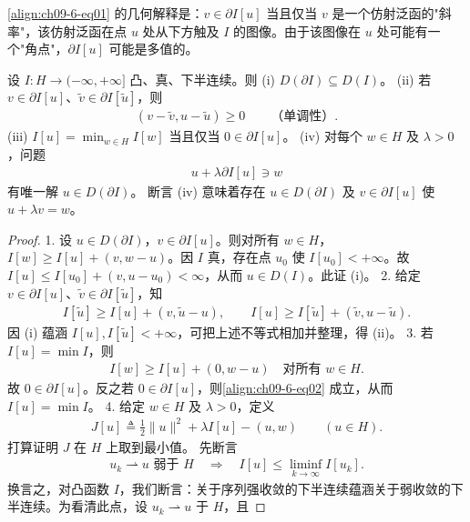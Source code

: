 \documentclass[../../main.tex]{subfiles}
\begin{document}
\eqref{align:ch09-6-eq01} 的几何解释是：$v\in\partial I[u]$ 当且仅当 $v$ 是一个仿射泛函的"斜率"，该仿射泛函在点 $u$ 处从下方触及 $I$ 的图像。由于该图像在 $u$ 处可能有一个"角点"，$\partial I[u]$ 可能是多值的。

\begin{theorem}[次微分的性质]\label{theorem:ch09-6-1-次微分性质}
设 $I:H\to(-\infty,+\infty]$ 凸、真、下半连续。则
(i) $D(\partial I)\subseteq D(I)$。
(ii) 若 $v\in\partial I[u]$、$\widetilde{v}\in\partial I[\widetilde{u}]$，则
\begin{align*}
(v-\widetilde{v},u-\widetilde{u})\geqslant 0\qquad\text{（单调性）}.
\end{align*}
(iii) $I[u]=\min_{w\in H}I[w]$ 当且仅当 $0\in\partial I[u]$。
(iv) 对每个 $w\in H$ 及 $\lambda>0$，问题
\begin{align*}
u+\lambda\partial I[u]\ni w
\end{align*}
有唯一解 $u\in D(\partial I)$。
断言 (iv) 意味着存在 $u\in D(\partial I)$ 及 $v\in\partial I[u]$ 使 $u+\lambda v=w$。
\begin{proof}
1. 设 $u\in D(\partial I)$，$v\in\partial I[u]$。则对所有 $w\in H$，$I[w]\geqslant I[u]+(v,w-u)$。因 $I$ 真，存在点 $u_0$ 使 $I[u_0]<+\infty$。故 $I[u]\leqslant I[u_0]+(v,u-u_0)<\infty$，从而 $u\in D(I)$。此证 (i)。
2. 给定 $v\in\partial I[u]$、$\widetilde{v}\in\partial I[\widetilde{u}]$，知
\begin{align*}
I[\widetilde{u}]\geqslant I[u]+(v,\widetilde{u}-u),\qquad I[u]\geqslant I[\widetilde{u}]+(\widetilde{v},u-\widetilde{u}).
\end{align*}
因 (i) 蕴涵 $I[u],I[\widetilde{u}]<+\infty$，可把上述不等式相加并整理，得 (ii)。
3. 若 $I[u]=\min I$，则
\begin{align}
I[w]\geqslant I[u]+(0,w-u)\quad\text{对所有 }w\in H.\label{align:ch09-6-eq02}
\end{align}
故 $0\in\partial I[u]$。反之若 $0\in\partial I[u]$，则\eqref{align:ch09-6-eq02} 成立，从而 $I[u]=\min I$。
4. 给定 $w\in H$ 及 $\lambda>0$，定义
\begin{align}
J[u]\triangleq\frac12\|u\|^2+\lambda I[u]-(u,w)\qquad (u\in H).\label{align:ch09-6-eq03}
\end{align}
打算证明 $J$ 在 $H$ 上取到最小值。
先断言
\begin{align}
u_k\rightharpoonup u\text{ 弱于 }H\quad\Longrightarrow\quad I[u]\leqslant\liminf_{k\to\infty}I[u_k].\label{align:ch09-6-eq04}
\end{align}
换言之，对凸函数 $I$，我们断言：关于序列强收敛的下半连续蕴涵关于弱收敛的下半连续。为看清此点，设 $u_k\rightharpoonup u$ 于 $H$，且

\end{proof}
\end{theorem}
\end{document}
